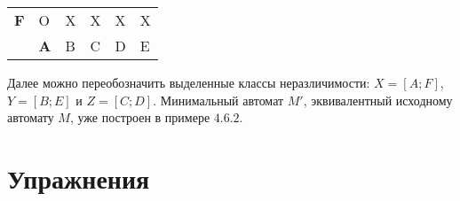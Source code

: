 \begin{myexample}
\begin{center}
\begin{tabular}{llllll}
\multicolumn{1}{l|}{\textbf{F}} & \multicolumn{1}{l|}{O} & \multicolumn{1}{l|}{X} & \multicolumn{1}{l|}{X} & \multicolumn{1}{l|}{X} & \multicolumn{1}{l|}{X} \\ \cline{2-6}
                                & \textbf{A}             & B                      & C                      & D                      & E
\end{tabular}
\end{center}
Далее можно переобозначить выделенные классы неразличимости: $X = [A;F]$, $Y = [B;E]$ и $Z = [C;D]$. Минимальный автомат $M'$, эквивалентный исходному автомату $M$, уже построен в примере $4.6.2$.
\end{myexample}



\section{Упражнения}
\label{Chapter4Exs}
%
